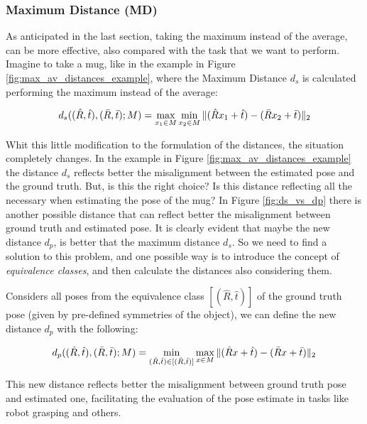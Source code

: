 \subsubsection{Maximum Distance (MD)}\label{subsubsec:maximum_distance}
As anticipated in the last section, taking the maximum instead of the average, can be more effective, also compared with the task that we want to perform. Imagine to take a mug, like in the example in Figure \ref{fig:max_av_distances_example}, where the Maximum Distance $d_s$ is calculated performing the maximum instead of the average:

\begin{equation}
    \label{eq:maximum_distance}
    d_s((\hat{R}, \hat{t}), (\bar{R}, \bar{t}); M) = \max_{x_1 \in M} \min_{x_2 \in M} \|{(\hat{R}x_1 + \hat{t}) - (\bar{R}x_2 + \bar{t})}\|_2
\end{equation}

Whit this little modification to the formulation of the distances, the situation completely changes. In the example in Figure \ref{fig:max_av_distances_example} the distance $d_s$ reflects better the misalignment between the estimated pose and the ground truth. But, is this the right choice? Is this distance reflecting all the necessary when estimating the pose of the mug? In Figure \ref{fig:ds_vs_dp} there is another possible distance that can reflect better the misalignment between ground truth and estimated pose. It is clearly evident that maybe the new distance $d_p$, is better that the maximum distance $d_s$. So we need to find a solution to this problem, and one possible way is to introduce the concept of \emph{equivalence classes}, and then calculate the distances also considering them.

Considers all poses from the equivalence class $[(\hat{R}, \hat{t})]$ of the ground truth pose (given by pre-defined symmetries of the object), we can define the new distance $d_p$ with the following:

\begin{equation}
    \label{eq:maximum_distance_eq_classes}
    d_p((\hat{R}, \hat{t}), (\bar{R}, \bar{t}); M) = \min_{(\hat{R}, \hat{t}) \in [(\hat{R}, \hat{t})]} \max_{x \in M} \|{(\hat{R}x + \hat{t}) - (\bar{R}x + \bar{t})}\|_2
\end{equation}

This new distance reflects better the misalignment between ground truth pose and estimated one, facilitating the evaluation of the pose estimate in tasks like robot grasping and others.

